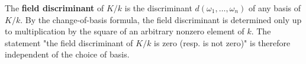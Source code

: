 The \textbf{field discriminant} of $K/k$ is the discriminant $d(\omega_1, \dots, \omega_n)$ of any basis of $K/k$. By the change-of-basis formula, the field discriminant is determined only up to multiplication by the square of an arbitrary nonzero element of $k$. The statement "the field discriminant of $K/k$ is zero (resp. is not zero)" is therefore independent of the choice of basis.
